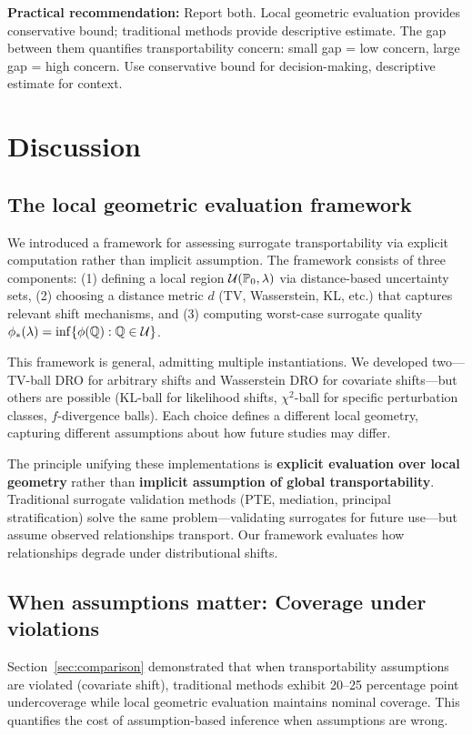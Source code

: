 \documentclass{article}
\newcommand{\PP}{\mathbb{P}}
\begin{document}
\textbf{Practical recommendation:} Report both. Local geometric evaluation provides conservative bound; traditional methods provide descriptive estimate. The gap between them quantifies transportability concern: small gap = low concern, large gap = high concern. Use conservative bound for decision-making, descriptive estimate for context.

\section{Discussion}\label{sec:discussion}

\subsection{The local geometric evaluation framework}

We introduced a framework for assessing surrogate transportability via explicit computation rather than implicit assumption. The framework consists of three components: (1) defining a local region $\cU(\PP_0, \lambda)$ via distance-based uncertainty sets, (2) choosing a distance metric $d$ (TV, Wasserstein, KL, etc.) that captures relevant shift mechanisms, and (3) computing worst-case surrogate quality $\phi_*(\lambda) = \inf\{\phi(\mathbb{Q}) : \mathbb{Q} \in \mathcal{U}\}$.

This framework is general, admitting multiple instantiations. We developed two---TV-ball DRO for arbitrary shifts and Wasserstein DRO for covariate shifts---but others are possible (KL-ball for likelihood shifts, $\chi^2$-ball for specific perturbation classes, $f$-divergence balls). Each choice defines a different local geometry, capturing different assumptions about how future studies may differ.

The principle unifying these implementations is \textbf{explicit evaluation over local geometry} rather than \textbf{implicit assumption of global transportability}. Traditional surrogate validation methods (PTE, mediation, principal stratification) solve the same problem---validating surrogates for future use---but assume observed relationships transport. Our framework evaluates how relationships degrade under distributional shifts.

\subsection{When assumptions matter: Coverage under violations}

Section~\ref{sec:comparison} demonstrated that when transportability assumptions are violated (covariate shift), traditional methods exhibit 20--25 percentage point undercoverage while local geometric evaluation maintains nominal coverage. This quantifies the cost of assumption-based inference when assumptions are wrong.
\end{document}
